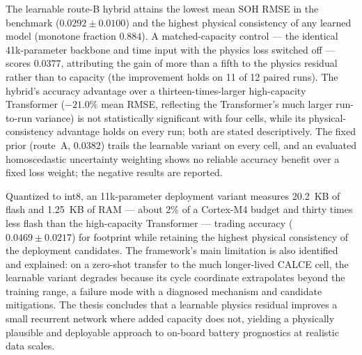 \begin{doublespacing}
The learnable route-B hybrid attains the lowest mean SOH RMSE in the benchmark ($0.0292 \pm 0.0100$) and the highest physical consistency of any learned model (monotone fraction $0.884$). A matched-capacity control --- the identical 41k-parameter backbone and time input with the physics loss switched off --- scores $0.0377$, attributing the gain of more than a fifth to the physics residual rather than to capacity (the improvement holds on 11 of 12 paired runs). The hybrid's accuracy advantage over a thirteen-times-larger high-capacity Transformer ($-21.0\%$ mean RMSE, reflecting the Transformer's much larger run-to-run variance) is not statistically significant with four cells, while its physical-consistency advantage holds on every run; both are stated descriptively. The fixed prior (route~A, $0.0382$) trails the learnable variant on every cell, and an evaluated homoscedastic uncertainty weighting shows no reliable accuracy benefit over a fixed loss weight; the negative results are reported.

Quantized to int8, an 11k-parameter deployment variant measures 20.2~KB of flash and 1.25~KB of RAM --- about 2\% of a Cortex-M4 budget and thirty times less flash than the high-capacity Transformer --- trading accuracy ($0.0469 \pm 0.0217$) for footprint while retaining the highest physical consistency of the deployment candidates. The framework's main limitation is also identified and explained: on a zero-shot transfer to the much longer-lived CALCE cell, the learnable variant degrades because its cycle coordinate extrapolates beyond the training range, a failure mode with a diagnosed mechanism and candidate mitigations. The thesis concludes that a learnable physics residual improves a small recurrent network where added capacity does not, yielding a physically plausible and deployable approach to on-board battery prognostics at realistic data scales.
\end{doublespacing}
